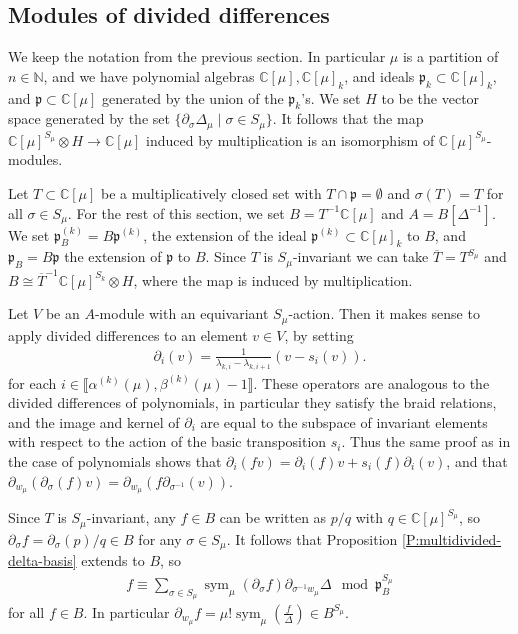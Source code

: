 \documentclass[11pt,fleqn]{article}
\newcommand\NN{\mathbb N}
\newcommand\CC{\mathbb C}
\newcommand\ot{\otimes}
\renewcommand\to{\longrightarrow}
\newcommand\p{\mathfrak p}
\newcommand\interval[1]{\llbracket #1 \rrbracket}
\DeclareMathOperator\sym{sym}
\begin{document}
\subsection{Modules of divided differences}
We keep the notation from the previous section. In particular $\mu$ is a 
partition of $n \in \NN$, and we have polynomial algebras $\CC[\mu], 
\CC[\mu]_k$, and ideals $\p_k \subset \CC[\mu]_k$, and $\p \subset 
\CC[\mu]$ generated by the union of the $\p_k$'s. We set $H$ to be the vector 
space generated by the set $\{\partial_\sigma \Delta_\mu \mid \sigma \in S_\mu
\}$. It follows that the map $\CC[\mu]^{S_\mu} \ot H \to \CC[\mu]$ induced by 
multiplication is an isomorphism of $\CC[\mu]^{S_\mu}$-modules.

Let $T \subset \CC[\mu]$ be a multiplicatively closed set with $T \cap \p = 
\emptyset$ and $\sigma(T) = T$ for all $\sigma \in S_\mu$. For the rest of this
section, we set $B = T^{-1} \CC[\mu]$ and $A = B[\Delta^{-1}]$. We set 
$\p^{(k)}_B = B\p^{(k)}$, the extension of the ideal $\p^{(k)} \subset 
\CC[\mu]_k$ to $B$, and $\p_B = B\p$ the extension of $\p$ to $B$. Since $T$ 
is $S_\mu$-invariant we can take $\overline T = T^{S_\mu}$ and $B \cong 
\overline T^{-1} \CC[\mu]^{S_k} \ot H$, where the map is induced by 
multiplication.

Let $V$ be an $A$-module with an equivariant $S_\mu$-action. Then it makes 
sense to apply divided differences to an element $v \in V$, by setting
\begin{align*}
\partial_{i}(v) = \frac{1}{\lambda_{k,i} - \lambda_{k,i+1}} (v - s_i(v)).
\end{align*}
for each $i \in \interval{\alpha^{(k)}(\mu), \beta^{(k)}(\mu) -1}$. These 
operators are analogous to the divided differences of polynomials, in 
particular they satisfy the braid relations, and the image and kernel of 
$\partial_{i}$ are equal to the subspace of invariant elements with respect to 
the action of the basic transposition $s_i$. Thus the same proof as in the 
case of polynomials shows that $\partial_{i}(fv) = \partial_{i}(f)v + s_i(f) 
\partial_{i}(v)$, and that $\partial_{w_\mu}(\partial_\sigma(f) v)= 
\partial_{w_\mu}(f \partial_{\sigma^{-1}}(v))$.

Since $T$ is $S_\mu$-invariant, any $f \in B$ can be written as $p/q$ with $q 
\in \CC[\mu]^{S_\mu}$, so $\partial_\sigma f = \partial_\sigma(p)/q \in B$
for any $\sigma \in S_\mu$. It follows that Proposition 
\ref{P:multidivided-delta-basis} extends to $B$, so
\begin{align*}
f \equiv \sum_{\sigma \in S_\mu} 
\sym_\mu(\partial_{\sigma} f) \partial_{\sigma^{-1} w_\mu} \Delta \mod 
\p_B^{S_\mu}
\end{align*}
for all $f \in B$. In particular $\partial_{w_\mu} f = \mu! \sym_\mu\left( 
\frac{f}{\Delta}\right) \in B^{S_\mu}$. 
\end{document}
